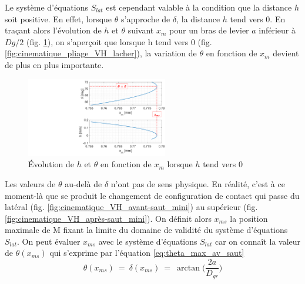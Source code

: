 Le système d'équations $S_{lat}$ est cependant valable à la condition que la distance $h$ soit positive. En effet, lorsque $\theta$ s'approche de $\delta$, la distance $h$ tend vers 0. En traçant alors l'évolution de $h$ et $\theta$ suivant $x_m$ pour un bras de levier $a$ inférieur à $Dg/2$ (fig. \ref{fig:theta_saut}), on s'aperçoit que lorsque h tend vers 0 (fig. \ref{fig:cinematique_pliage_VH_lacher}), la variation de $\theta$ en fonction de $x_m$ devient de plus en plus importante.
\begin{figure}[!htb]
\begin{center}
 \captionsetup{justification=centering} 
   \includegraphics[trim={12cm 0cm 0cm 0cm},clip,width=0.55\textwidth]{../Chap6/Figure/theta_saut.pdf}
   \caption{Évolution de $h$ et $\theta$ en fonction de $x_m$ lorsque $h$ tend vers 0}
   \label{fig:theta_saut}
\end{center}	
\end{figure}    

Les valeurs de $\theta$ au-delà de $\delta$ n'ont pas de sens physique. En réalité, c'est à ce moment-là que se produit le changement de configuration de contact qui passe du latéral (fig. \ref{fig:cinematique_VH_avant-saut_mini}) au supérieur (fig. \ref{fig:cinematique_VH_après-saut_mini}). On définit alors $x_{ms}$ la position maximale de M fixant la limite du domaine de validité du système d'équations $S_{lat}$. On peut évaluer $x_{ms}$ avec le système d'équations $S_{lat}$ car on connaît la valeur de $\theta(x_{ms})$ qui s'exprime par l'équation \ref{eq:theta_max_av_saut}
\begin{equation}
\theta(x_{ms})\ =\ \delta(x_{ms})\ =\ \arctan\biggl(\dfrac{2a}{D_{gr}}\biggr)
\label{eq:theta_max_av_saut}
\end{equation} 
